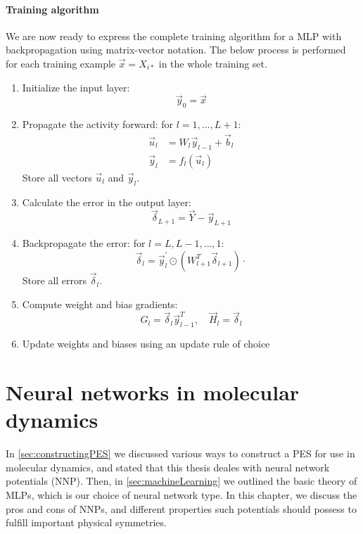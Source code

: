 \documentclass[twoside,english]{uiofysmaster}
\begin{document}
\subsubsection{Training algorithm}
We are now ready to express the complete training algorithm for a MLP with backpropagation using
matrix-vector notation. The below process is performed for each training example $\vec{x} = X_{i*}$ in the whole
training set.
\begin{enumerate}
 \item Initialize the input layer:
 \begin{equation}
  \vec{y}_0 = \vec{x}
 \end{equation}
 \item Propagate the activity forward: for $l = 1,\dots,L+1$:
 \begin{equation}
 \begin{aligned}
  \vec{u}_l &= W_l\vec{y}_{l-1} + \vec{b}_l \\
  \vec{y}_l &= f_l(\vec{u}_l)
  \label{forwardPropMatrix}
 \end{aligned}
 \end{equation}
 Store all vectors $\vec{u}_l$ and $\vec{y}_l$.
 \item Calculate the error in the output layer:
 \begin{equation}
  \vec{\delta}_{L+1} = \vec{Y} - \vec{y}_{L+1}
 \end{equation}
 \item Backpropagate the error: for $l = L, L-1, \dots ,1$:
 \begin{equation}
 \vec{\delta}_l = \vec{y}^\prime_l \odot (W^T_{l+1}\vec{\delta}_{l+1}) \cdot 
 \label{backPropMatrix}
 \end{equation}
 Store all errors $\vec{\delta}_l$. 
 \item Compute weight and bias gradients: 
 \begin{equation}
  G_l = \vec{\delta}_l \vec{y}_{l-1}^T, \quad \vec{H}_l = \vec{\delta}_l
  \label{weightUpdate}
 \end{equation}
 \item Update weights and biases using an update rule of choice
\end{enumerate}


\chapter{Neural networks in molecular dynamics} \label{sec:NNsAndMD}
In \autoref{sec:constructingPES} we discussed various ways to construct a PES for use in molecular dynamics, and
stated that this thesis deales with neural network potentials (NNP). Then, in \autoref{sec:machineLearning}
we outlined the basic theory of MLPs, which is our choice of neural network type. In this chapter, 
we discuss the pros and cons of NNPs, and different properties such potentials should possess to 
fulfill important physical symmetries. 
\end{document}
